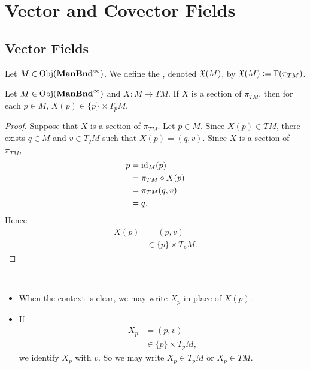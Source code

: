 \documentclass{book}
\begin{document}
\newpage
\chapter{Vector and Covector Fields}

\section{Vector Fields}

\begin{defn}
	Let $M \in \operatorname{Obj}(\operatorname*{\text{\textbf{ManBnd}}^{\infty}})$. We define the , denoted $\mathfrak{X}(M)$, by $\mathfrak{X}(M) \vcentcolon= \Gamma(\pi_{TM})$. 
\end{defn}

\begin{ex}
	Let $M \in \operatorname{Obj}(\operatorname*{\text{\textbf{ManBnd}}^{\infty}})$ and $X: M \rightarrow TM$. If $X$ is a section of $\pi_{TM}$, then for each $p \in M$, $X(p) \in \{p\} \times T_p M$.
\end{ex}

\begin{proof}
	Suppose that $X$ is a section of $\pi_{TM}$. Let $p \in M$. Since $X(p) \in TM$, there exists $q \in M$ and $v \in T_qM$ such that $X(p) = (q, v)$. Since $X$ is a section of $\pi_{TM}$, 
	\begin{align*}
		p
		& = \operatorname{id}_M(p) \\
		& = \pi_{TM} \circ X(p) \\
		& = \pi_{TM} (q, v) \\
		& = q.
	\end{align*}
	Hence 
	\begin{align*}
		X(p) 
		& = (p, v) \\
		& \in \{p\} \times T_pM.
	\end{align*}
\end{proof}

\begin{note}\
	\begin{itemize}
		\item When the context is clear, we may write $X_p$ in place of $X(p)$.
		\item If 
		\begin{align*}
			X_p 
			& = (p, v) \\
			& \in \{p\} \times T_pM,
		\end{align*}
		we identify $X_p$ with $v$. So we may write $X_p \in T_pM$ or $X_p \in TM$.
	\end{itemize}
\end{note}
\end{document}
